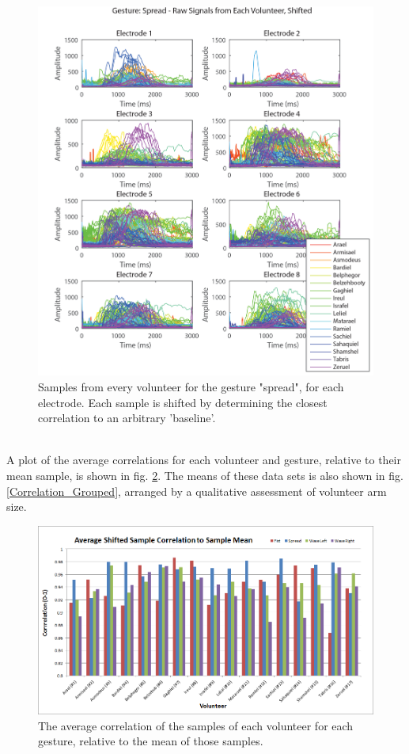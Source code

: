 \documentclass[journal]{IEEEtran}
\begin{document}
    \begin{figure}[H]
    \centering
    \includegraphics[width=.8\columnwidth]{EMG/spread_all_correlated}
    \caption{Samples from every volunteer for the gesture "spread", for each electrode. Each sample is shifted by determining the closest correlation to an arbitrary 'baseline'.}
    \label{spread_all_correlated}
    \end{figure}

\\
A plot of the average correlations for each volunteer and gesture, relative to their mean sample, is shown in fig. \ref{Average_Corr_Bar}. The means of these data sets is also shown in fig. \ref{Correlation_Grouped}, arranged by a qualitative assessment of volunteer arm size.

    \begin{figure}[H]
    \centering
    \includegraphics[width=.95\columnwidth]{EMG/Average_Corr_Bar}
    \caption{The average correlation of the samples of each volunteer for each gesture, relative to the mean of those samples.}
    \label{Average_Corr_Bar}
    \end{figure}
    
\end{document}
